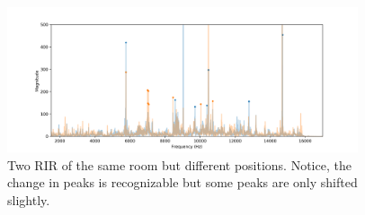\begin{figure}[h!]
	\centering
	\includegraphics[width=0.92\textwidth]{images/response-same-room-different-pos.png}
	\caption{
		Two RIR of the same room but different positions. Notice, the change in peaks is recognizable but some peaks are only shifted slightly.
	}
	\label{fig:response-same-room-different-pos}
\end{figure}
